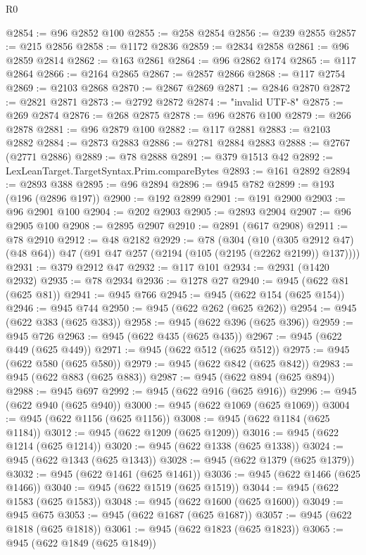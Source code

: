 \begin{lexlean}{R0}
\begin{coremodule}
@2854 := @96 @2852 @100
@2855 := @258 @2854
@2856 := @239 @2855
@2857 := @215 @2856
@2858 := @1172 @2836
@2859 := @2834 @2858
@2861 := @96 @2859 @2814
@2862 := @163 @2861
@2864 := @96 @2862 @174
@2865 := @117 @2864
@2866 := @2164 @2865
@2867 := @2857 @2866
@2868 := @117 @2754
@2869 := @2103 @2868
@2870 := @2867 @2869
@2871 := @2846 @2870
@2872 := @2821 @2871
@2873 := @2792 @2872
@2874 := "invalid UTF-8"
@2875 := @269 @2874
@2876 := @268 @2875
@2878 := @96 @2876 @100
@2879 := @266 @2878
@2881 := @96 @2879 @100
@2882 := @117 @2881
@2883 := @2103 @2882
@2884 := @2873 @2883
@2886 := @2781 @2884 @2883
@2888 := @2767 (@2771 @2886)
@2889 := @78 @2888
@2891 := @379 @1513 @42
@2892 := LexLeanTarget.TargetSyntax.Prim.compareBytes
@2893 := @161 @2892
@2894 := @2893 @388
@2895 := @96 @2894
@2896 := @945 @782
@2899 := @193 (@196 (@2896 @197))
@2900 := @192 @2899
@2901 := @191 @2900
@2903 := @96 @2901 @100
@2904 := @202 @2903
@2905 := @2893 @2904
@2907 := @96 @2905 @100
@2908 := @2895 @2907
@2910 := @2891 (@617 @2908)
@2911 := @78 @2910
@2912 := @48 @2182
@2929 := @78
    (@304
      (@10 (@305 @2912 @47) (@48 @64))
      @47
      (@91 @47 @257 (@2194 (@105 (@2195 (@2262 @2199)) @137))))
@2931 := @379 @2912 @47
@2932 := @117 @101
@2934 := @2931 (@1420 @2932)
@2935 := @78 @2934
@2936 := @1278 @27
@2940 := @945 (@622 @81 (@625 @81))
@2941 := @945 @766
@2945 := @945 (@622 @154 (@625 @154))
@2946 := @945 @744
@2950 := @945 (@622 @262 (@625 @262))
@2954 := @945 (@622 @383 (@625 @383))
@2958 := @945 (@622 @396 (@625 @396))
@2959 := @945 @726
@2963 := @945 (@622 @435 (@625 @435))
@2967 := @945 (@622 @449 (@625 @449))
@2971 := @945 (@622 @512 (@625 @512))
@2975 := @945 (@622 @580 (@625 @580))
@2979 := @945 (@622 @842 (@625 @842))
@2983 := @945 (@622 @883 (@625 @883))
@2987 := @945 (@622 @894 (@625 @894))
@2988 := @945 @697
@2992 := @945 (@622 @916 (@625 @916))
@2996 := @945 (@622 @940 (@625 @940))
@3000 := @945 (@622 @1069 (@625 @1069))
@3004 := @945 (@622 @1156 (@625 @1156))
@3008 := @945 (@622 @1184 (@625 @1184))
@3012 := @945 (@622 @1209 (@625 @1209))
@3016 := @945 (@622 @1214 (@625 @1214))
@3020 := @945 (@622 @1338 (@625 @1338))
@3024 := @945 (@622 @1343 (@625 @1343))
@3028 := @945 (@622 @1379 (@625 @1379))
@3032 := @945 (@622 @1461 (@625 @1461))
@3036 := @945 (@622 @1466 (@625 @1466))
@3040 := @945 (@622 @1519 (@625 @1519))
@3044 := @945 (@622 @1583 (@625 @1583))
@3048 := @945 (@622 @1600 (@625 @1600))
@3049 := @945 @675
@3053 := @945 (@622 @1687 (@625 @1687))
@3057 := @945 (@622 @1818 (@625 @1818))
@3061 := @945 (@622 @1823 (@625 @1823))
@3065 := @945 (@622 @1849 (@625 @1849))

\end{coremodule}
\end{lexlean}
